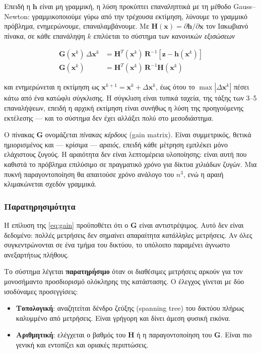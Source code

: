 Επειδή η $\mathbf{h}$ είναι μη γραμμική, η λύση προκύπτει επαναληπτικά με τη μέθοδο
Gauss--Newton: γραμμικοποιούμε γύρω από την τρέχουσα εκτίμηση, λύνουμε το γραμμικό
πρόβλημα, ενημερώνουμε, επαναλαμβάνουμε. Με
$\mathbf{H}(\mathbf{x}) = \partial \mathbf{h}/\partial \mathbf{x}$ τον Ιακωβιανό πίνακα, σε
κάθε επανάληψη $k$ επιλύεται το σύστημα των \emph{κανονικών εξισώσεων}

\begin{align}
\mathbf{G}(\mathbf{x}^{k}) \, \Delta \mathbf{x}^{k}
  &= \mathbf{H}^{T}(\mathbf{x}^{k}) \, \mathbf{R}^{-1}
     \left[\mathbf{z} - \mathbf{h}(\mathbf{x}^{k})\right] \\
\mathbf{G}(\mathbf{x}^{k})
  &= \mathbf{H}^{T}(\mathbf{x}^{k}) \, \mathbf{R}^{-1} \mathbf{H}(\mathbf{x}^{k})
\label{eq:gain}
\end{align}

και ενημερώνεται η εκτίμηση ως $\mathbf{x}^{k+1} = \mathbf{x}^{k} + \Delta \mathbf{x}^{k}$,
έως ότου το $\max|\Delta \mathbf{x}^{k}|$ πέσει κάτω από ένα κατώφλι σύγκλισης. Η σύγκλιση
είναι τυπικά ταχεία, της τάξης των 3--5 επαναλήψεων, επειδή η αρχική εκτίμηση είναι
συνήθως η λύση της προηγούμενης εκτέλεσης — και το σύστημα δεν έχει αλλάξει πολύ στο
μεσοδιάστημα.

Ο πίνακας $\mathbf{G}$ ονομάζεται \emph{πίνακας κέρδους} (gain matrix). Είναι συμμετρικός,
θετικά ημιορισμένος και — κρίσιμα — \emph{αραιός}, επειδή κάθε μέτρηση εμπλέκει μόνο
ελάχιστους ζυγούς. Η αραιότητα δεν είναι λεπτομέρεια υλοποίησης: είναι αυτή που καθιστά
το πρόβλημα επιλύσιμο σε πραγματικό χρόνο για δίκτυα χιλιάδων ζυγών. Μια πυκνή
παραγοντοποίηση θα απαιτούσε χρόνο ανάλογο του $n^3$, ενώ η αραιή κλιμακώνεται σχεδόν
γραμμικά.

\subsubsection*{Παρατηρησιμότητα}

Η επίλυση της \eqref{eq:gain} προϋποθέτει ότι ο $\mathbf{G}$ είναι αντιστρέψιμος. Αυτό δεν
είναι δεδομένο: πολλές μετρήσεις δεν σημαίνει απαραίτητα \emph{κατάλληλες} μετρήσεις. Αν
όλες συγκεντρώνονται σε ένα τμήμα του δικτύου, το υπόλοιπο παραμένει άγνωστο ανεξαρτήτως
πλήθους.

Το σύστημα λέγεται \textbf{παρατηρήσιμο} όταν οι διαθέσιμες μετρήσεις αρκούν για τον
μονοσήμαντο προσδιορισμό ολόκληρης της κατάστασης. Ο έλεγχος γίνεται με δύο ισοδύναμες
προσεγγίσεις:

\begin{itemize}
\item \textbf{Τοπολογική}: αναζητείται δένδρο ζεύξης (spanning tree) του δικτύου πλήρως
      καλυμμένο από μετρήσεις. Είναι γρήγορη και δίνει άμεση φυσική εικόνα.
\item \textbf{Αριθμητική}: ελέγχεται ο βαθμός του $\mathbf{H}$ ή η παραγοντοποίηση του
      $\mathbf{G}$. Είναι πιο γενική και εντοπίζει και οριακές περιπτώσεις.
\end{itemize}

